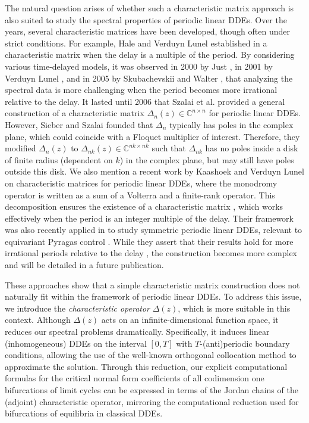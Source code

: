 \documentclass[english]{myarticle}
\begin{document}
\begin{sloppypar}
The natural question arises of whether such a characteristic matrix approach is also suited to study the spectral properties of periodic linear DDEs. Over the years, several characteristic matrices have been developed, though often under strict conditions. For example, Hale and Verduyn Lunel established in \cite{Hale1993} a characteristic matrix when the delay is a multiple of the period. By considering various time-delayed models, it was observed in 2000 by Just \cite{Just2000}, in 2001 by Verduyn Lunel \cite{Lunel2001}, and in 2005 by Skubachevskii and Walter \cite{Skubachevskii2006}, that analyzing the spectral data is more challenging when the period becomes more irrational relative to the delay. It lasted until 2006 that Szalai et al. \cite{Szalai2006} provided a general construction of a characteristic matrix $\Delta_n(z) \in \mathbb{C}^{n \times n}$ for periodic linear DDEs. However, Sieber and Szalai \cite{Sieber2011} founded that $\Delta_n$ typically has poles in the complex plane, which could coincide with a Floquet multiplier of interest. Therefore, they modified $\Delta_n(z)$ to $\Delta_{nk}(z) \in \mathbb{C}^{nk \times nk}$ such that $\Delta_{nk}$ has no poles inside a disk of finite radius (dependent on $k$) in the complex plane, but may still have poles outside this disk. We also mention a recent work by Kaashoek and Verduyn Lunel \cite[Chapter 10]{Kaashoek2022} on characteristic matrices for periodic linear DDEs, where the monodromy operator is written as a sum of a Volterra and a finite-rank operator. This decomposition ensures the existence of a characteristic matrix \cite[Chapter 6]{Kaashoek2022}, which works effectively when the period is an integer multiple of the delay. Their framework was also recently applied in \cite{Wolff2022a} to study symmetric periodic linear DDEs, relevant to equivariant Pyragas control \cite{Pyragas1992}. While they assert that their results hold for more irrational periods relative to the delay \cite[Section 11.1]{Kaashoek2022}, the construction becomes more complex and will be detailed in a future publication.

These approaches show that a simple characteristic matrix construction does not naturally fit within the framework of periodic linear DDEs. To address this issue, we introduce the \emph{characteristic operator} $\Delta(z)$, which is more suitable in this context. Although $\Delta(z)$ acts on an infinite-dimensional function space, it reduces our spectral problems dramatically. Specifically, it induces linear (inhomogeneous) DDEs on the interval $[0,T]$ with $T$-(anti)periodic boundary conditions, allowing the use of the well-known orthogonal collocation method \cite{Engelborghs2001,Engelborghs2002a} to approximate the solution. Through this reduction, our explicit computational formulas for the critical normal form coefficients of all codimension one bifurcations of limit cycles can be expressed in terms of the Jordan chains of the (adjoint) characteristic operator, mirroring the computational reduction used for bifurcations of equilibria in classical DDEs.


\end{sloppypar}
\end{document}
